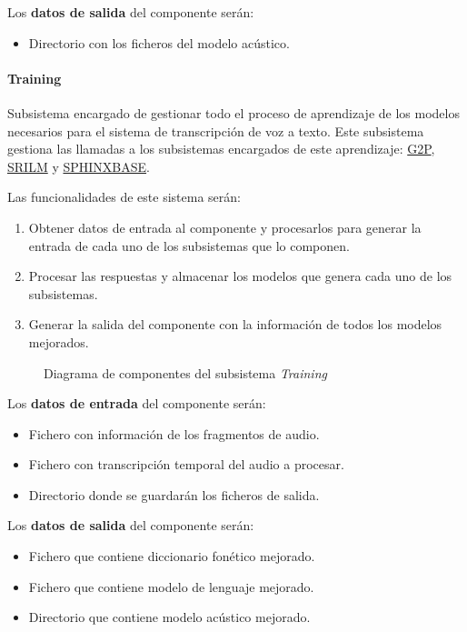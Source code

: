 \documentclass[../main.tex]{subfiles}
\begin{document}
Los \textbf{datos de salida} del componente serán:
\begin{itemize}
    \item Directorio con los ficheros del modelo acústico.
\end{itemize}

\paragraph{Training}\label{par:training}
Subsistema encargado de gestionar todo el proceso de aprendizaje de los modelos necesarios para el sistema de transcripción de voz a texto. Este subsistema gestiona las llamadas a los subsistemas encargados de este aprendizaje: \hyperref[par:g2p]{G2P}, \hyperref[par:srilm]{SRILM} y \hyperref[par:sphinxbase]{SPHINXBASE}.

Las funcionalidades de este sistema serán:
\begin{enumerate}
    \item Obtener datos de entrada al componente y procesarlos para generar la entrada de cada uno de los subsistemas que lo componen.
    \item Procesar las respuestas y almacenar los modelos que genera cada uno de los subsistemas.
    \item Generar la salida del componente con la información de todos los modelos mejorados.
\end{enumerate}

\begin{figure}[H]
    \centering
    
    \label{fig:components_training}
    \caption{Diagrama de componentes del subsistema \textit{Training}}
\end{figure}

Los \textbf{datos de entrada} del componente serán:
\begin{itemize}
    \item Fichero con información de los fragmentos de audio.
    \item Fichero con transcripción temporal del audio a procesar.
    \item Directorio donde se guardarán los ficheros de salida.
\end{itemize}

Los \textbf{datos de salida} del componente serán:
\begin{itemize}
    \item Fichero que contiene diccionario fonético mejorado.
    \item Fichero que contiene modelo de lenguaje mejorado.
    \item Directorio que contiene modelo acústico mejorado.
\end{itemize}
\end{document}
